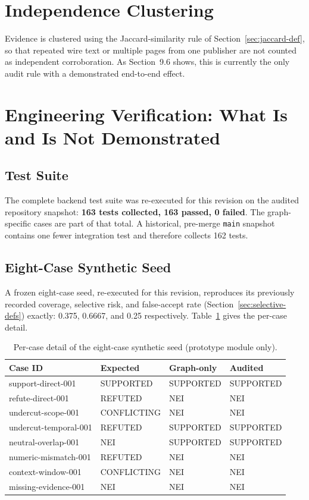 \documentclass[12pt,a4paper,openany]{report}
\begin{document}
\section{Independence Clustering}
Evidence is clustered using the Jaccard-similarity rule of Section~\ref{sec:jaccard-def}, so that repeated wire text or multiple pages from one publisher are not counted as independent corroboration. As Section~9.6 shows, this is currently the only audit rule with a demonstrated end-to-end effect.

\section{Engineering Verification: What Is and Is Not Demonstrated}
\subsection{Test Suite}
The complete backend test suite was re-executed for this revision on the audited repository snapshot: \textbf{163 tests collected, 163 passed, 0 failed}. The graph-specific cases are part of that total. A historical, pre-merge \texttt{main} snapshot contains one fewer integration test and therefore collects 162 tests.

\subsection{Eight-Case Synthetic Seed}
A frozen eight-case seed, re-executed for this revision, reproduces its previously recorded coverage, selective risk, and false-accept rate (Section~\ref{sec:selective-defs}) exactly: 0.375, 0.6667, and 0.25 respectively. Table~\ref{tab:seed-detail-2} gives the per-case detail.

\begin{table}[H]
\centering
\caption{Per-case detail of the eight-case synthetic seed (prototype module only).}
\label{tab:seed-detail-2}
\small
\begin{tabularx}{\textwidth}{p{3.3cm}p{2.4cm}p{2.2cm}p{2.2cm}}
\toprule
Case ID & Expected & Graph-only & Audited \\
\midrule
support-direct-001 & SUPPORTED & SUPPORTED & SUPPORTED \\
refute-direct-001 & REFUTED & NEI & NEI \\
undercut-scope-001 & CONFLICTING & NEI & NEI \\
undercut-temporal-001 & REFUTED & SUPPORTED & SUPPORTED \\
neutral-overlap-001 & NEI & SUPPORTED & SUPPORTED \\
numeric-mismatch-001 & REFUTED & NEI & NEI \\
context-window-001 & CONFLICTING & NEI & NEI \\
missing-evidence-001 & NEI & NEI & NEI \\
\bottomrule
\end{tabularx}
\end{table}
\end{document}
